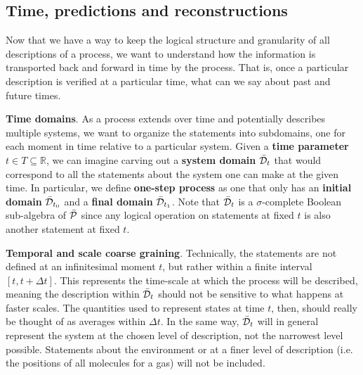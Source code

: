 \documentclass[10pt, onecolumn, longbibliography, nofootinbib]{revtex4-2}
\begin{document}
\subsection{Time, predictions and reconstructions}

Now that we have a way to keep the logical structure and granularity of all descriptions of a process, we want to understand how the information is transported back and forward in time by the process. That is, once a particular description is verified at a particular time, what can we say about past and future times.

\textbf{Time domains}. As a process extends over time and potentially describes multiple systems, we want to organize the statements into subdomains, one for each moment in time relative to a particular system. Given a \textbf{time parameter} $t \in T \subseteq \mathbb{R}$, we can imagine carving out a \textbf{system domain} $\tdomain_t$ that would correspond to all the statements about the system one can make at the given time. In particular, we define \textbf{one-step process} as one that only has an \textbf{initial domain} $\tdomain_{t_0}$ and a \textbf{final domain} $\tdomain_{t_1}$. Note that $\tdomain_t$ is a $\sigma$-complete Boolean sub-algebra of $\tdomain[P]$ since any logical operation on statements at fixed $t$ is also another statement at fixed $t$.

\textbf{Temporal and scale coarse graining}. Technically, the statements are not defined at an infinitesimal moment $t$, but rather within a finite interval $[t, t + \Delta t]$. This represents the time-scale at which the process will be described, meaning the description within $\tdomain_t$ should not be sensitive to what happens at faster scales. The quantities used to represent states at time $t$, then, should really be thought of as averages within $\Delta t$. In the same way, $\tdomain_t$ will in general represent the system at the chosen level of description, not the narrowest level possible. Statements about the environment or at a finer level of description (i.e. the positions of all molecules for a gas) will not be included.
\end{document}
